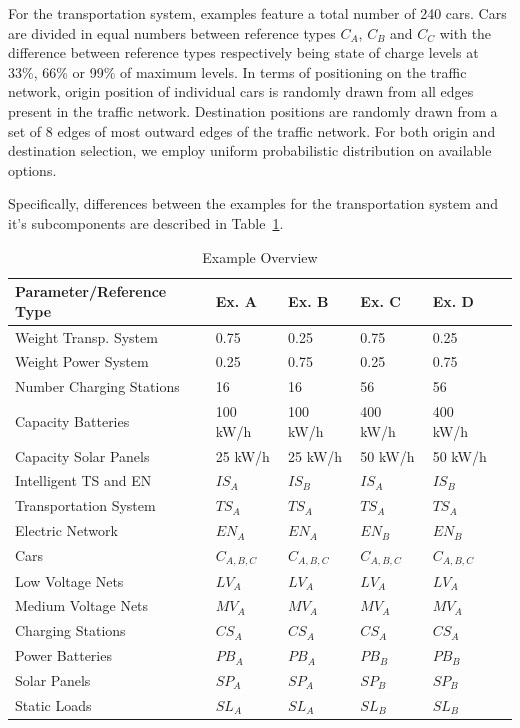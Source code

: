 For the transportation system, examples feature a total number of 240 cars. Cars are divided in equal numbers between reference types $C_{A}$, $C_{B}$ and $C_{C}$ with the difference between reference types respectively being state of charge levels at 33\%, 66\% or 99\% of maximum levels. In terms of positioning on the traffic network, origin position of individual cars is randomly drawn from all edges present in the traffic network. Destination positions are randomly drawn from a set of 8 edges of most outward edges of the traffic network. For both origin and destination selection, we employ uniform probabilistic distribution on available options. 

Specifically, differences between the examples for the transportation system and it's subcomponents are described in Table~\ref{tab:example1}. 

\begin{table}[h]
	\renewcommand{\arraystretch}{1.3}
	\caption{Example Overview}
	\label{tab:example1}
	\centering
	\begin{tabular}{llllll}
		\hline
		\textbf{Parameter/Reference Type}                    & \textbf{Ex. A}    & \textbf{Ex. B} & \textbf{Ex. C} & \textbf{Ex. D}\\ \hline
		Weight Transp. System 			& 0.75	      & 0.25  	& 0.75	& 0.25\\
		Weight Power System 			& 0.25	      & 0.75  	& 0.25	& 0.75\\
		Number Charging Stations              & 16         & 16 		& 56	& 56\\
		Capacity Batteries          & 100 kW/h         & 100 kW/h 		& 400 kW/h		& 400 kW/h\\
		Capacity Solar Panels               & 25 kW/h         & 25 kW/h 		& 50 kW/h		& 50 kW/h	\\ \hline
		Intelligent TS and EN                 & $IS_{A}$         & $IS_{B}$ 		& $IS_{A}$		& $IS_{B}$	\\ 
		Transportation System                 & $TS_{A}$         & $TS_{A}$ 		& $TS_{A}$		& $TS_{A}$	\\ 
		Electric Network                & $EN_{A}$         & $EN_{A}$ 		& $EN_{B}$		& $EN_{B}$	\\ 
		Cars                  & $C_{A,B,C}$          & $C_{A,B,C}$		& $C_{A,B,C}$		& $C_{A,B,C}$	\\ 
		Low Voltage Nets                 & $LV_{A}$         & $LV_{A}$ 		& $LV_{A}$		& $LV_{A}$	\\ 
		Medium Voltage Nets                 & $MV_{A}$         & $MV_{A}$ 		& $MV_{A}$		& $MV_{A}$	\\ 
		Charging Stations                 & $CS_{A}$         & $CS_{A}$ 		& $CS_{A}$		& $CS_{A}$	\\ 
		Power Batteries                & $PB_{A}$         & $PB_{A}$ 		& $PB_{B}$		& $PB_{B}$	\\ 
		Solar Panels                 & $SP_{A}$         & $SP_{A}$ 		& $SP_{B}$		& $SP_{B}$	\\ 
		Static Loads                 & $SL_{A}$         & $SL_{A}$ 		& $SL_{B}$		& $SL_{B}$	\\ \hline
	\end{tabular}
\end{table}

